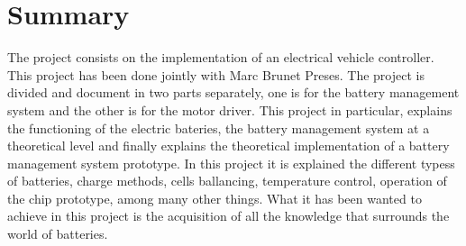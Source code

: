 \chapter{Summary}
\label{chap:Summary}

The project consists on the implementation of an electrical vehicle controller. This project has been done jointly with Marc Brunet Preses. The project is divided and document in two parts separately, one is for the battery management system and the other is for the motor driver. This project in particular, explains the functioning of the electric bateries, the battery management system at a theoretical level and finally explains the theoretical implementation of a battery management system prototype. In this project it is explained the different typess of batteries, charge methods, cells ballancing, temperature control, operation of the chip prototype, among many other things. What it has been wanted to achieve in this project is the acquisition of all the knowledge that surrounds the world of batteries.